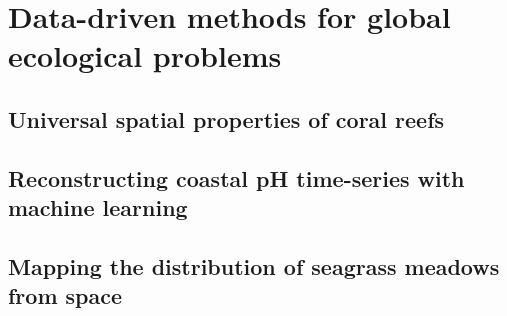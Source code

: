 \documentclass[
	10pt, %
	a4paper, %
]{LegrandOrangeBook}
\begin{document}
 {
  \hypersetup{hidelinks}
  \part{Data-driven methods for global ecological problems}
 }
%

\chapterspaceabove{6.75cm}
\chapterspacebelow{7.25cm}

\chapter{Universal spatial properties of coral reefs}
%

\chapterspaceabove{6.75cm}
\chapterspacebelow{7.25cm}

\chapter{Reconstructing coastal pH time-series with machine learning}
%

\chapterspaceabove{6.75cm}
\chapterspacebelow{7.25cm}

\chapter{Mapping the distribution of seagrass meadows from space}
\end{document}
